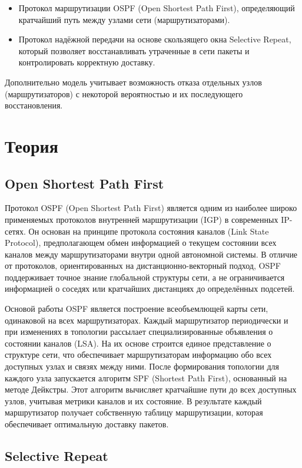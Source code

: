 \documentclass[a4paper,12pt]{article}
\begin{document}
\begin{itemize}
    \item Протокол маршрутизации OSPF (Open Shortest Path First), определяющий кратчайший путь между узлами сети (маршрутизаторами).
    \item Протокол надёжной передачи на основе скользящего окна Selective Repeat, который позволяет восстанавливать утраченные в сети пакеты и контролировать корректную доставку.
\end{itemize}

Дополнительно модель учитывает возможность отказа отдельных узлов (маршрутизаторов) с некоторой вероятностью и их последующего восстановления.

\section{Теория}

\subsection{Open Shortest Path First}

Протокол OSPF (Open Shortest Path First) является одним из наиболее широко применяемых протоколов внутренней маршрутизации (IGP) в современных IP-сетях. Он основан на принципе протокола состояния каналов (Link State Protocol), предполагающем обмен информацией о текущем состоянии всех каналов между маршрутизаторами внутри одной автономной системы. В отличие от протоколов, ориентированных на дистанционно-векторный подход, OSPF поддерживает точное знание глобальной структуры сети, а не ограничивается информацией о соседях или кратчайших дистанциях до определённых подсетей.

Основой работы OSPF является построение всеобъемлющей карты сети, одинаковой на всех маршрутизаторах. Каждый маршрутизатор периодически и при изменениях в топологии рассылает специализированные объявления о состоянии каналов (LSA). На их основе строится единое представление о структуре сети, что обеспечивает маршрутизаторам информацию обо всех доступных узлах и связях между ними. После формирования топологии для каждого узла запускается алгоритм SPF (Shortest Path First), основанный на методе Дейкстры. Этот алгоритм вычисляет кратчайшие пути до всех доступных узлов, учитывая метрики каналов и их состояние. В результате каждый маршрутизатор получает собственную таблицу маршрутизации, которая обеспечивает оптимальную доставку пакетов.

\subsection{Selective Repeat}
\end{document}
